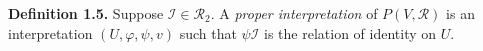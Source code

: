 \textbf{Definition 1.5.} Suppose $\mathcal{I} \in \mathcal{R}_2$. A \textit{proper interpretation} of $P(V, \mathcal{R})$ is an interpretation $(U, \varphi, \psi, v)$ such that $\psi\mathcal{I}$ is the relation of identity on $U$.
